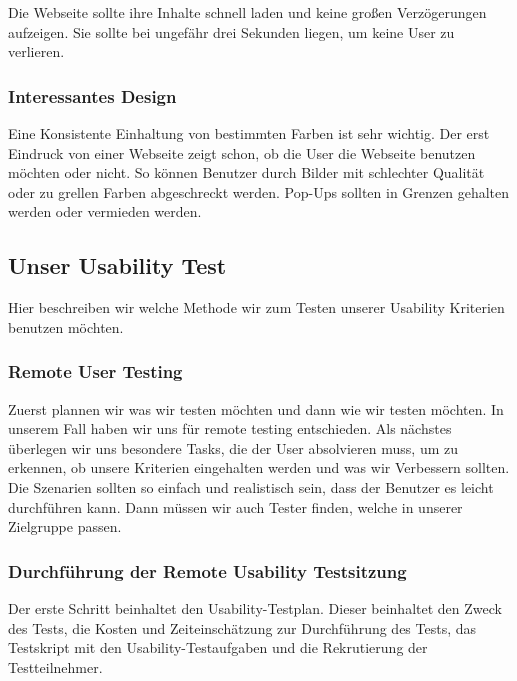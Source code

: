 \noindent Die Webseite sollte ihre Inhalte schnell laden und keine großen Verzögerungen
aufzeigen. Sie sollte bei ungefähr drei Sekunden liegen, um keine User zu verlieren.

\subsubsection{Interessantes Design}

\noindent Eine Konsistente Einhaltung von bestimmten Farben ist sehr wichtig. Der erst Eindruck von
einer Webseite zeigt schon, ob die User die Webseite benutzen möchten oder nicht.
So können Benutzer durch Bilder mit schlechter Qualität oder zu grellen Farben abgeschreckt werden.
Pop-Ups sollten in Grenzen gehalten werden oder vermieden werden.

\subsection{Unser Usability Test}
Hier beschreiben wir welche Methode wir zum Testen unserer Usability Kriterien benutzen
möchten.

\subsubsection{Remote User Testing}

\noindent Zuerst plannen wir was wir testen möchten und dann wie wir testen möchten. In unserem Fall haben wir uns
für remote testing entschieden. Als nächstes überlegen wir uns besondere Tasks, die der User absolvieren muss, um
zu erkennen, ob unsere Kriterien eingehalten werden und was wir Verbessern sollten.
Die Szenarien sollten so einfach und realistisch sein, dass der Benutzer es leicht durchführen kann.
Dann müssen wir auch Tester finden, welche in unserer Zielgruppe passen.

\subsubsection{Durchführung der Remote Usability Testsitzung}

Der erste Schritt beinhaltet den Usability-Testplan. Dieser beinhaltet den Zweck des Tests, 
die Kosten und Zeiteinschätzung zur Durchführung des Tests, das Testskript mit den Usability-Testaufgaben und die Rekrutierung der Testteilnehmer. 
\\

